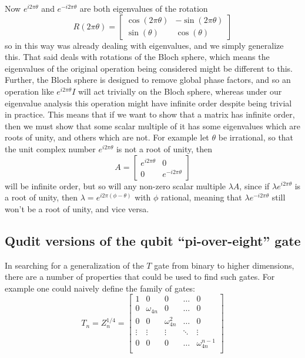 Now $e^{i 2\pi\theta}$ and $e^{-i 2\pi\theta}$ are both eigenvalues of the rotation
\[R(2\pi \theta) = \left[\begin{matrix}
	\cos(2\pi\theta) & -\sin(2\pi\theta) \\
	\sin(\theta) & \cos(\theta)
\end{matrix}\right]\]
so in this way \cite{universal-qubit} was already dealing with eigenvalues, and we simply generalize this. That said \cite{universal-qubit} deals with rotations of the Bloch sphere, which means the eigenvalues of the original operation being considered might be different to this. Further, the Bloch sphere is designed to remove global phase factors, and so an operation like $e^{i2\pi\theta}I$ will act trivially on the Bloch sphere, whereas under our eigenvalue analysis this operation might have infinite order despite being trivial in practice. This means that if we want to show that a matrix has infinite order, then we must show that some scalar multiple of it has some eigenvalues which are roots of unity, and others which are not. For example let $\theta$ be irrational, so that the unit complex number $e^{i2\pi\theta}$ is not a root of unity, then
\[A = \left[\begin{matrix}
	e^{i2\pi\theta} & 0 \\
	0 & e^{-i2\pi\theta}
\end{matrix}\right]\]
will be infinite order, but so will any non-zero scalar multiple $\lambda A$, since if $\lambda e^{i2\pi\theta}$ is a root of unity, then $\lambda = e^{i2\pi(\phi - \theta)}$ with $\phi$ rational, meaning that $\lambda e^{-i2\pi\theta}$ still won't be a root of unity, and vice versa.
\subsection{Qudit versions of the qubit ``pi-over-eight'' gate}
In searching for a generalization of the $T$ gate from binary to higher dimensions, there are a number of properties that could be used to find such gates. For example one could naively define the family of gates:
\[T_n = Z_n^{1/4} = \left[\begin{matrix}
	1 & 0 & 0 & \dots & 0 \\
	0 & \omega_{4n} & 0 & \dots & 0 \\
	0 & 0 & \omega_{4n}^2 & \dots & 0 \\
	\vdots & \vdots & \vdots & \ddots & \vdots \\
	0 & 0 & 0 & \dots & \omega_{4n}^{n-1} \\
\end{matrix}\right]\]

